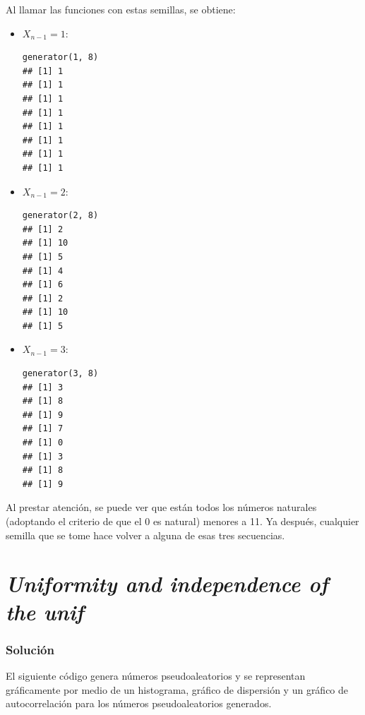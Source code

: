 \documentclass[12pt]{article}
\begin{document}
Al llamar las funciones con estas semillas, se obtiene:

\begin{itemize}
  \item $X_{n-1} = 1:$
\begin{lstlisting}
generator(1, 8)
## [1] 1
## [1] 1
## [1] 1
## [1] 1
## [1] 1
## [1] 1
## [1] 1
## [1] 1
\end{lstlisting}
  \item $X_{n-1} = 2:$
\begin{lstlisting}
generator(2, 8)
## [1] 2
## [1] 10
## [1] 5
## [1] 4
## [1] 6
## [1] 2
## [1] 10
## [1] 5
\end{lstlisting}
  \item $X_{n-1} = 3:$
\begin{lstlisting}
generator(3, 8)
## [1] 3
## [1] 8
## [1] 9
## [1] 7
## [1] 0
## [1] 3
## [1] 8
## [1] 9
\end{lstlisting}
\end{itemize}

Al prestar atención, se puede ver que están todos los números naturales (adoptando el criterio de que el 0 es natural) menores a 11. Ya después, cualquier semilla que se tome hace volver a alguna de esas tres secuencias.



\section{\textit{Uniformity and independence of the unif}}

\subsubsection{Solución}


El siguiente código genera números pseudoaleatorios y se representan gráficamente por medio de un histograma, gráfico de dispersión y un gráfico de autocorrelación para los números pseudoaleatorios generados.
\end{document}
